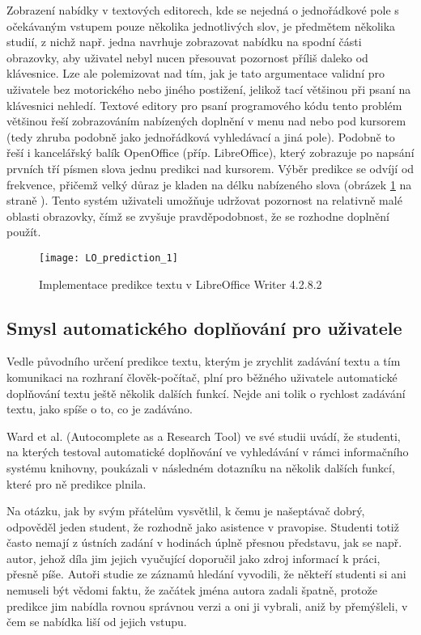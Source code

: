 \documentclass[a4paper,11pt]{article}
\begin{document}
Zobrazení nabídky v textových editorech, kde se nejedná o jednořádkové pole s očekávaným vstupem pouze několika jednotlivých slov, je předmětem několika studií, z nichž např. jedna navrhuje zobrazovat nabídku na spodní části obrazovky, aby uživatel nebyl nucen přesouvat pozornost příliš daleko od klávesnice. %
Lze ale polemizovat nad tím, jak je tato argumentace validní pro uživatele bez motorického nebo jiného postižení, jelikož tací většinou při psaní na klávesnici nehledí. Textové editory pro psaní programového kódu tento problém většinou řeší zobrazováním nabízených doplnění v menu nad nebo pod kursorem (tedy zhruba podobně jako jednořádková vyhledávací a jiná pole). Podobně to řeší i kancelářský balík OpenOffice (příp. LibreOffice), který zobrazuje po napsání prvních tří písmen slova jednu predikci nad kursorem. Výběr predikce se odvíjí od frekvence, přičemž velký důraz je kladen na délku nabízeného slova (obrázek \ref{fig:LOpredict} na straně \pageref{fig:LOpredict}). Tento systém uživateli umožňuje udržovat pozornost na relativně malé oblasti obrazovky, čímž se zvyšuje pravděpodobnost, že se rozhodne doplnění použít. 

\begin{figure}[h]
	\caption{Implementace predikce textu v LibreOffice Writer 4.2.8.2}
	\label{fig:LOpredict}
	\centering
	\texttt{[image: LO\_prediction\_1]}
\end{figure}

\subsection{Smysl automatického doplňování pro uživatele}

Vedle původního určení predikce textu, kterým je zrychlit zadávání textu a tím komunikaci na rozhraní člověk-počítač, plní pro běžného uživatele automatické doplňování textu ještě několik dalších funkcí. Nejde ani tolik o rychlost zadávání textu, jako spíše o to, co je zadáváno. 

Ward et al. (Autocomplete as a Research Tool) ve své studii uvádí, že studenti, na kterých testoval automatické doplňování ve vyhledávání v rámci informačního systému knihovny, poukázali v následném dotazníku na několik dalších funkcí, které pro ně predikce plnila. 

Na otázku, jak by svým přátelům vysvětlil, k čemu je našeptávač dobrý, odpověděl jeden student, že rozhodně jako asistence v pravopise. Studenti totiž často nemají z ústních zadání v hodinách úplně přesnou představu, jak se např. autor, jehož díla jim jejich vyučující doporučil jako zdroj informací k práci, přesně píše. Autoři studie ze záznamů hledání vyvodili, že někteří studenti si ani nemuseli být vědomi faktu, že začátek jména autora zadali špatně, protože predikce jim nabídla rovnou správnou verzi a oni ji vybrali, aniž by přemýšleli, v čem se nabídka liší od jejich vstupu. 
\end{document}
